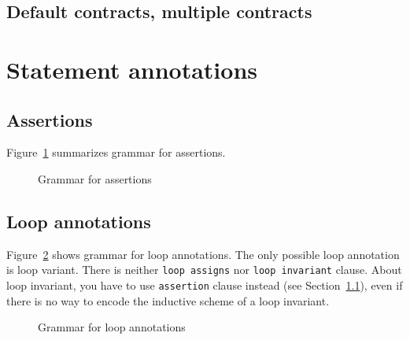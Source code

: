 \subsection{Default contracts, multiple contracts}
\nodiff


\section{Statement annotations}


\subsection{Assertions}
\label{sec:assertions}
\nodiff

Figure~\ref{fig:gram:assertions} summarizes grammar for assertions.
\begin{figure}[htbp]
  \begin{cadre}
    
  \end{cadre}
  \caption{Grammar for assertions}
  \label{fig:gram:assertions}
\end{figure}


\subsection{Loop annotations}
\label{sec:loop_annot}


Figure~\ref{fig:gram:loops} shows grammar for loop annotations. The only
possible loop annotation is loop variant. There is neither
\lstinline|loop assigns| nor \lstinline|loop invariant| clause. About loop
invariant, you have to use \lstinline|assertion| clause instead (see
Section~\ref{sec:assertions}), even if there is no way to encode the inductive
scheme of a loop invariant.
\begin{figure}[htbp]
  \begin{cadre}
    
  \end{cadre}
  \caption{Grammar for loop annotations}
  \label{fig:gram:loops}
\end{figure}

